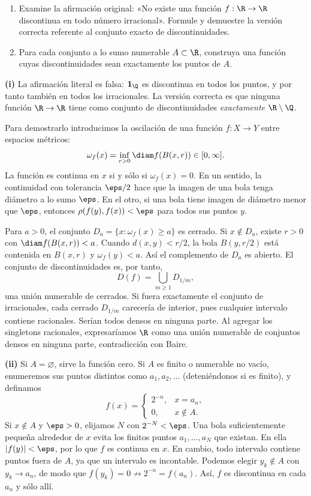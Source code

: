 \begin{ejercicio}\label{ej:lectura-10-9}
\begin{enumerate}[label=(\roman*)]
\item Examine la afirmación original: «No existe una función $f:\R\to\R$ discontinua en todo número irracional». Formule y demuestre la versión correcta referente al conjunto exacto de discontinuidades.
\item Para cada conjunto a lo sumo numerable $A\subset\R$, construya una función cuyas discontinuidades sean exactamente los puntos de $A$.
\end{enumerate}
\end{ejercicio}
\begin{solucion}
\textbf{(i)} La afirmación literal es falsa: $\mathbf1_{\Q}$ es discontinua en todos los puntos, y por tanto también en todos los irracionales. La versión correcta es que ninguna función $\R\to\R$ tiene como conjunto de discontinuidades \emph{exactamente} $\R\setminus\Q$.

Para demostrarlo introducimos la oscilación de una función $f:X\to Y$ entre espacios métricos:
\[
 \omega_f(x)=\inf_{r>0}\diam f(B(x,r))\in[0,\infty].
\]
La función es continua en $x$ si y sólo si $\omega_f(x)=0$. En un sentido, la continuidad con tolerancia $\eps/2$ hace que la imagen de una bola tenga diámetro a lo sumo $\eps$. En el otro, si una bola tiene imagen de diámetro menor que $\eps$, entonces $\rho(f(y),f(x))<\eps$ para todos sus puntos $y$.

Para $a>0$, el conjunto $D_a=\{x:\omega_f(x)\geq a\}$ es cerrado. Si $x\notin D_a$, existe $r>0$ con $\diam f(B(x,r))<a$. Cuando $d(x,y)<r/2$, la bola $B(y,r/2)$ está contenida en $B(x,r)$ y $\omega_f(y)<a$. Así el complemento de $D_a$ es abierto. El conjunto de discontinuidades es, por tanto,
\[
 D(f)=\bigcup_{m\geq1}D_{1/m},
\]
una unión numerable de cerrados. Si fuera exactamente el conjunto de irracionales, cada cerrado $D_{1/m}$ carecería de interior, pues cualquier intervalo contiene racionales. Serían todos densos en ninguna parte. Al agregar los singletons racionales, expresaríamos $\R$ como una unión numerable de conjuntos densos en ninguna parte, contradicción con Baire.

\textbf{(ii)} Si $A=\varnothing$, sirve la función cero. Si $A$ es finito o numerable no vacío, enumeremos sus puntos distintos como $a_1,a_2,\ldots$ (deteniéndonos si es finito), y definamos
\[
 f(x)=\begin{cases}2^{-n},&x=a_n,\\0,&x\notin A.\end{cases}
\]
Si $x\notin A$ y $\eps>0$, elijamos $N$ con $2^{-N}<\eps$. Una bola suficientemente pequeña alrededor de $x$ evita los finitos puntos $a_1,\ldots,a_N$ que existan. En ella $|f(y)|<\eps$, por lo que $f$ es continua en $x$. En cambio, todo intervalo contiene puntos fuera de $A$, ya que un intervalo es incontable. Podemos elegir $y_k\notin A$ con $y_k\to a_n$, de modo que $f(y_k)=0\not\to2^{-n}=f(a_n)$. Así, $f$ es discontinua en cada $a_n$ y sólo allí.
\end{solucion}

